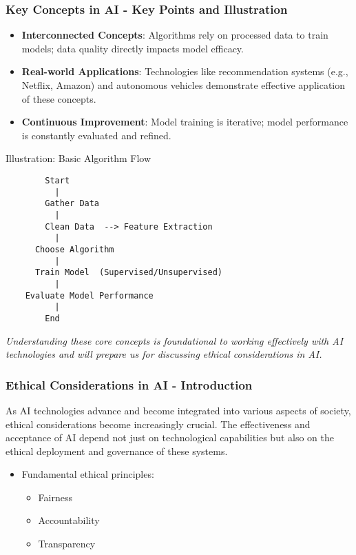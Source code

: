 \documentclass[aspectratio=169]{beamer}
\begin{document}
\begin{frame}[fragile]
    \frametitle{Key Concepts in AI - Key Points and Illustration}
    \begin{itemize}
        \item \textbf{Interconnected Concepts}: Algorithms rely on processed data to train models; data quality directly impacts model efficacy.
        \item \textbf{Real-world Applications}: Technologies like recommendation systems (e.g., Netflix, Amazon) and autonomous vehicles demonstrate effective application of these concepts.
        \item \textbf{Continuous Improvement}: Model training is iterative; model performance is constantly evaluated and refined.
    \end{itemize}
    
    \begin{block}{Illustration: Basic Algorithm Flow}
    \begin{verbatim}
        Start
          |
        Gather Data
          |
        Clean Data  --> Feature Extraction
          |              
      Choose Algorithm
          |
      Train Model  (Supervised/Unsupervised)
          |
    Evaluate Model Performance
          |
        End
    \end{verbatim}
    \end{block}

    \textit{Understanding these core concepts is foundational to working effectively with AI technologies and will prepare us for discussing ethical considerations in AI.}
\end{frame}

\begin{frame}[fragile]
    \frametitle{Ethical Considerations in AI - Introduction}
    As AI technologies advance and become integrated into various aspects of society, 
    ethical considerations become increasingly crucial. The effectiveness and acceptance 
    of AI depend not just on technological capabilities but also on the ethical deployment 
    and governance of these systems. 
    \begin{itemize}
        \item Fundamental ethical principles:
        \begin{itemize}
            \item Fairness
            \item Accountability
            \item Transparency
        \end{itemize}
    \end{itemize}
\end{frame}
\end{document}
